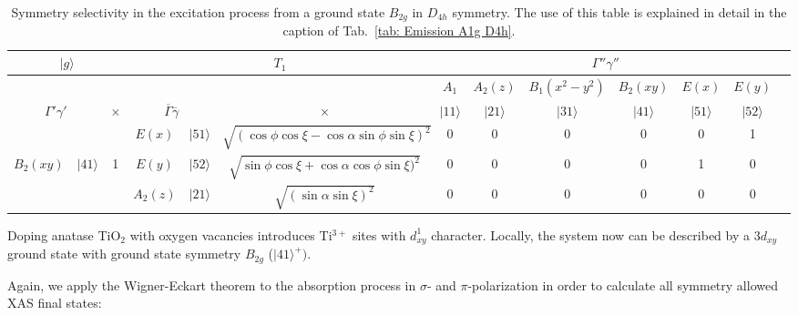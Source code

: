\documentclass[twocolumn,prb,twocolumn,amsmath,superscriptaddress,nofootinbib,amssymb]{revtex4-1}
\begin{document}
\begin{widetext}
\begin{table*}[htbp]
{\begin{tabular}{cc|c||cc|c||ccccccc}
  \multicolumn{3}{c||}{$|g\rangle$}     &  \multicolumn{3}{c||}{$T_1$}  &     \multicolumn{6}{c}{$\Gamma''\gamma''$}                                    \\
\hline
           &  &    &&      &&   $A_1$ & $A_2(z)$ &     $B_1(x^2-y^2)$ &      $B_2(xy)$ &   $E(x)$ &   $E(y)$         \\
           \multicolumn{2}{c|}{$\Gamma'\gamma'$}      & $\times$& \multicolumn{2}{c|}{$\overline{\Gamma}\overline{\gamma}$}&$\times$ &  $|11\rangle$ & $|21\rangle$ &     $|31\rangle$ &      $|41\rangle$ &   $|51\rangle$ &   $|52\rangle$    \\

\hline
\hline
   & & & $E(x)$ &  $|51\rangle$& $\sqrt{(\cos\phi\cos\xi-\cos\alpha\sin\phi\sin\xi)^2}$&       0 &   0&       0 &          0 &          0 &          1&                               \\

   $B_2(xy)$& $|41\rangle$  & 1     &   $E(y)$ & $|52\rangle$&$\sqrt{\sin\phi\cos\xi+\cos\alpha\cos\phi\sin\xi)^2}$ &        0 &   0&      0 &          0 &          1 &          0 &            \\

      &     &  & $A_2(z)$ &    $|21\rangle$& $\sqrt{(\sin\alpha\sin\xi)^2}$  &   0 &      0&    0 &          0 &          0 &          0&                           \\

\hline
\end{tabular}}
\caption{\label{tab: Absorption B2g D4h} Symmetry selectivity in the excitation process from a ground state $B_{2g}$ in $D_{4h}$ symmetry. The use of this table is explained in detail in the caption of Tab.~\ref{tab: Emission A1g D4h}.}
\end{table*}

Doping anatase TiO$_2$ with oxygen vacancies introduces Ti$^{3+}$ sites with $d_{xy}^1$ character. Locally, the system now can be described by a $3d_{xy}$ ground state with ground state symmetry $B_{2g}$ ($|41\rangle^+)$.

Again, we apply the Wigner-Eckart theorem to the absorption process in $\sigma$- and $\pi$-polarization in order to calculate all symmetry allowed XAS final states:


\end{widetext}
\end{document}
